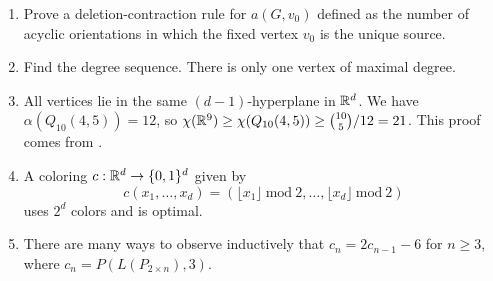 \begin{enumerate}
\item Prove a deletion-contraction rule for $a(G,v_0)$ defined as the number of acyclic orientations in which the fixed vertex $v_0$ is the unique source.

\item Find the degree sequence. There is only one vertex of maximal degree.

\item All vertices lie in the same $(d-1)$-hyperplane in $\mathbb{R}^d$. We have $\alpha(Q_{10}(4,5))=12$, so $\chi(\mathbb{R}^9)\geq \chi(Q_{10}(4,5))\geq {10 \choose 5}/12 = 21$. This proof comes from \cite{kahletaha}.

\item A coloring $c:\mathbb{R}^d\to\{0,1\}^d$ given by
$$c(x_1,\ldots,x_d)=(\lfloor x_1\rfloor \ \textrm{mod}\ 2,\ldots, \lfloor x_d\rfloor \ \textrm{mod}\ 2 )$$
uses $2^d$ colors and is optimal.

\item There are many ways to observe inductively that $c_n=2c_{n-1}-6$ for $n\geq 3$, where $c_n=P(L(P_{2\times n}), 3)$.


\end{enumerate}
